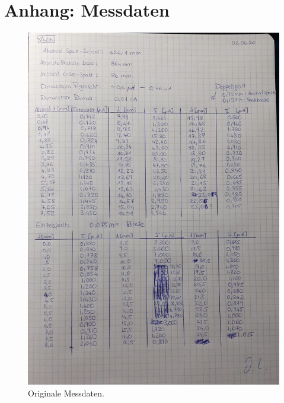 \newpage
\section*{Anhang: Messdaten}

\begin{figure}
    \centering
    \includegraphics[width=.7\textwidth]{plots/Daten.jpeg}    
    \caption{Originale Messdaten.}
\end{figure}